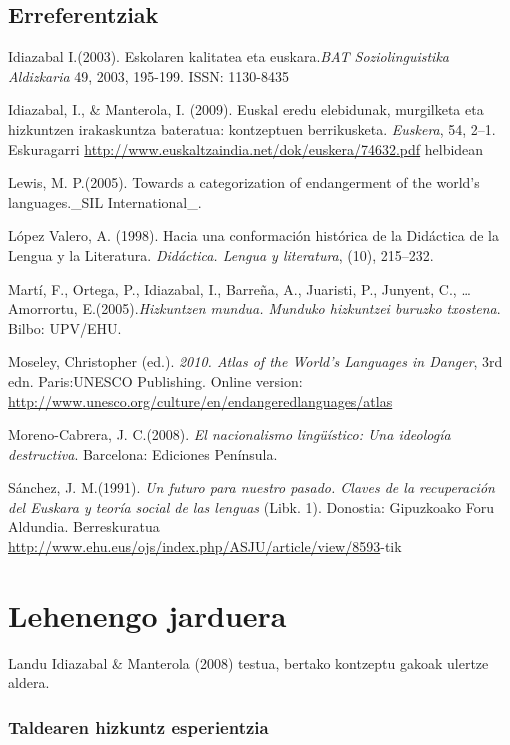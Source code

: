 \documentclass[
]{book}
\begin{document}
\hypertarget{erreferentziak}{%
\section{Erreferentziak}\label{erreferentziak}}

Idiazabal I.(2003). Eskolaren kalitatea eta euskara.\emph{BAT Soziolinguistika Aldizkaria} 49, 2003, 195-199. ISSN: 1130-8435

Idiazabal, I., \& Manterola, I. (2009). Euskal eredu elebidunak, murgilketa eta hizkuntzen irakaskuntza bateratua: kontzeptuen berrikusketa. \emph{Euskera}, 54, 2--1. Eskuragarri \url{http://www.euskaltzaindia.net/dok/euskera/74632.pdf} helbidean

Lewis, M. P.(2005). Towards a categorization of endangerment of the world's languages.\_SIL International\_.

López Valero, A. (1998). Hacia una conformación histórica de la Didáctica de la Lengua y la Literatura. \emph{Didáctica. Lengua y literatura}, (10), 215--232.

Martí, F., Ortega, P., Idiazabal, I., Barreña, A., Juaristi, P., Junyent, C., \ldots{} Amorrortu, E.(2005).\emph{Hizkuntzen mundua. Munduko hizkuntzei buruzko txostena}. Bilbo: UPV/EHU.

Moseley, Christopher (ed.). \emph{2010. Atlas of the World's Languages in Danger}, 3rd edn. Paris:UNESCO Publishing. Online version: \url{http://www.unesco.org/culture/en/endangeredlanguages/atlas}

Moreno-Cabrera, J. C.(2008). \emph{El nacionalismo lingüístico: Una ideología destructiva}. Barcelona: Ediciones Península.

Sánchez, J. M.(1991). \emph{Un futuro para nuestro pasado. Claves de la recuperación del Euskara y teoría social de las lenguas} (Libk. 1). Donostia: Gipuzkoako Foru Aldundia. Berreskuratua \href{http://www.ehu.eus/ojs/index.php/ASJU/article/view/8593-\%28e\%29tik}{http://www.ehu.eus/ojs/index.php/ASJU/article/view/8593}-tik

\hypertarget{lehenengo-jarduera}{%
\chapter*{Lehenengo jarduera}\label{lehenengo-jarduera}}

Landu Idiazabal \& Manterola (2008) testua, bertako kontzeptu gakoak ulertze aldera.

\hypertarget{taldearen-hizkuntz-esperientzia}{%
\subsection*{Taldearen hizkuntz esperientzia}\label{taldearen-hizkuntz-esperientzia}}
\end{document}
